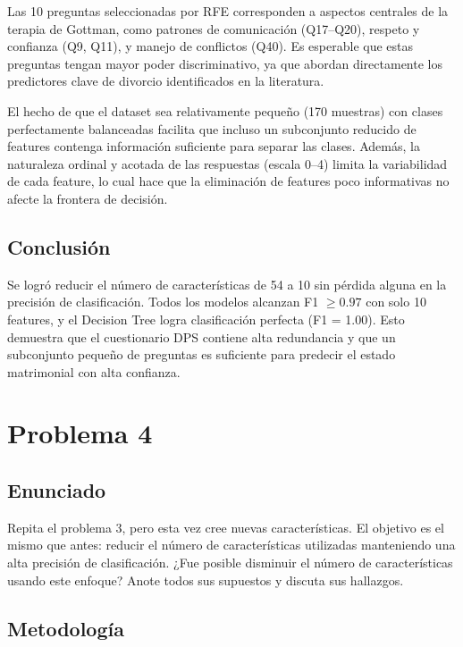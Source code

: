 \documentclass{article}
\begin{document}
Las 10 preguntas seleccionadas por RFE corresponden a aspectos centrales de la terapia de Gottman, como patrones de comunicación (Q17--Q20), respeto y confianza (Q9, Q11), y manejo de conflictos (Q40). Es esperable que estas preguntas tengan mayor poder discriminativo, ya que abordan directamente los predictores clave de divorcio identificados en la literatura.

El hecho de que el dataset sea relativamente pequeño (170 muestras) con clases perfectamente balanceadas facilita que incluso un subconjunto reducido de features contenga información suficiente para separar las clases. Además, la naturaleza ordinal y acotada de las respuestas (escala 0--4) limita la variabilidad de cada feature, lo cual hace que la eliminación de features poco informativas no afecte la frontera de decisión.

\subsection{Conclusión}

Se logró reducir el número de características de 54 a 10 sin pérdida alguna en la precisión de clasificación. Todos los modelos alcanzan F1 $\geq 0.97$ con solo 10 features, y el Decision Tree logra clasificación perfecta (F1 = 1.00). Esto demuestra que el cuestionario DPS contiene alta redundancia y que un subconjunto pequeño de preguntas es suficiente para predecir el estado matrimonial con alta confianza.


\section{Problema 4}

\subsection{Enunciado}

Repita el problema 3, pero esta vez cree nuevas características. El objetivo es el mismo que antes: reducir el número de características utilizadas manteniendo una alta precisión de clasificación. ¿Fue posible disminuir el número de características usando este enfoque? Anote todos sus supuestos y discuta sus hallazgos.

\subsection{Metodología}
\end{document}
